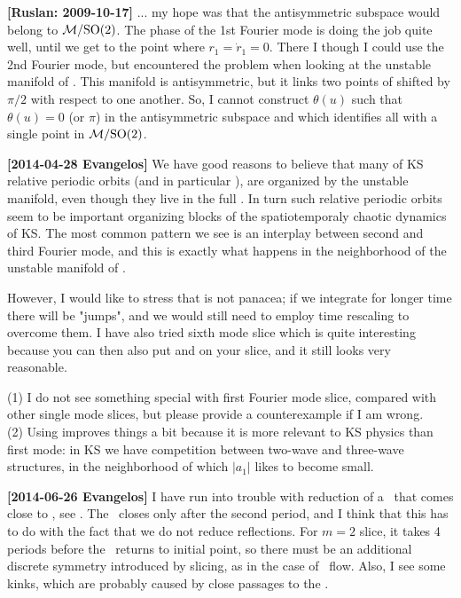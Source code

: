 \begin{description}
{\bf [Ruslan: 2009-10-17]}
... my hope was that the antisymmetric subspace would belong
to $\mathcal{M}/\textrm{SO}(2)$.
The phase of the 1st Fourier mode is doing the job quite
well, until we get to the point where $r_1 = \dot{r}_1 = 0$.
There I though I could use the 2nd Fourier mode, but
encountered the problem when looking at the unstable manifold
of .  This manifold is antisymmetric, but it links two
points of  shifted by $\pi/2$ with respect to one
another.  So, I cannot construct $\theta(u)$ such that
$\theta(u) = 0$ (or $\pi$) in the antisymmetric subspace and
which identifies all  with a single point in
$\mathcal{M}/\textrm{SO}(2)$.

{\bf[2014-04-28 Evangelos]}
We have good reasons to believe that many of KS relative periodic orbits
(and in particular ), are organized by the  unstable
manifold, even though they live in the full \statesp. In turn such relative
periodic orbits seem to be important organizing blocks of the
spatiotemporaly chaotic dynamics of KS. The most common pattern we see is
an interplay between second and third Fourier mode, and this is exactly
what happens in the neighborhood of the unstable manifold of .

However, I would like to stress that {\sFslice} is not
panacea; if we integrate for longer time there will be "jumps", and we
would still need to employ time rescaling to overcome them. I have also
tried sixth mode slice which is quite interesting because you can then
also put  and  on your slice, and it still looks very
reasonable.

(1) I do not see something special with first Fourier mode slice,
compared with other single mode slices, but please provide a
counterexample if I am wrong.
\\
(2) Using {\sFslice} improves things a bit because it is
more relevant to KS physics than first mode: in KS we have competition
between two-wave and three-wave structures, in the neighborhood of which
$|a_1|$ likes to become small.

{\bf [2014-06-26 Evangelos]} I have run into trouble with reduction of a
\rpo\ that comes close to , see
. The \rpo\ closes only after the
second period, and I think that this has to do with the fact that we do
not reduce reflections. For $m=2$ slice, it takes 4 periods before the
\rpo\ returns to initial point, so there must be an additional discrete
symmetry introduced by slicing, as in the case of \twomode\ flow.
Also, I see some kinks, which are probably caused by close passages to
the {\sliceBord}.


\end{description}
